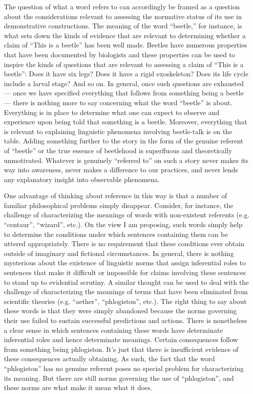 The question of what a word refers to can accordingly be framed as a question about the considerations relevant to assessing the normative status of its use in demonstrative constructions. The meaning of the word ``beetle,'' for instance, is what sets down the kinds of evidence that are relevant to determining whether a claim of ``This is a beetle'' has been well made. Beetles have numerous properties that have been documented by biologists and these properties can be used to inspire the kinds of questions that are relevant to assessing a claim of ``This is a beetle'': Does it have six legs? Does it have a rigid exoskeleton? Does its life cycle include a larval stage? And so on. In general, once such questions are exhausted --- once we have specified everything that follows from something being a beetle --- there is nothing more to say concerning what the word ``beetle'' is about. Everything is in place to determine what one can expect to observe and experience upon being told that something is a beetle. Moreover, everything that is relevant to explaining linguistic phenomena involving beetle-talk is on the table. Adding something further to the story in the form of the genuine referent of ``beetle'' or the true essence of beetlehood is superfluous and theoretically unmotivated. Whatever is genuinely ``referred to'' on such a story never makes its way into awareness, never makes a difference to our practices, and never lends any explanatory insight into observable phenomena. 

One advantage of thinking about reference in this way is that a number of familiar philosophical problems simply disappear. Consider, for instance, the challenge of characterizing the meanings of words with non-existent referents (e.g. ``centaur'', ``wizard'', etc.). On the view I am proposing, such words simply help to determine the conditions under which sentences containing them can be uttered appropriately. There is no requirement that these conditions ever obtain outside of imaginary and fictional circumstances. In general, there is nothing mysterious about the existence of linguistic norms that assign inferential roles to sentences that make it difficult or impossible for claims involving these sentences to stand up to evidential scrutiny. A similar thought can be used to deal with the challenge of characterizing the meanings of terms that have been eliminated from scientific theories (e.g. ``aether'', ``phlogiston'', etc.). The right thing to say about these words is that they were simply abandoned because the norms governing their use failed to sustain successful predictions and actions. There is nonetheless a clear sense in which sentences containing these words have determinate inferential roles and hence determinate meanings. Certain consequences follow from something being phlogiston. It's just that there is insufficient evidence of these consequences actually obtaining. As such, the fact that the word ``phlogiston'' has no genuine referent poses no special problem for characterizing its meaning. But there are still norms governing the use of ``phlogiston'', and these norms are what make it mean what it does.

